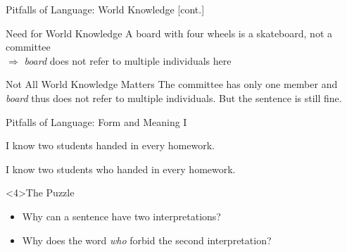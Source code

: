 \documentclass[xcolor={usenames,svgnames,x11names,dvipsnames,table}]{beamer}
\begin{document}
\begin{frame}{Pitfalls of Language: World Knowledge [cont.]}
    \begin{exe}
        \small
        \ex
        \begin{xlist}
        \end{xlist}
    \end{exe}

    \begin{block}{Need for World Knowledge}
        A board with four wheels is a skateboard, not a committee\\
        $\Rightarrow$ \emph{board} does not refer to multiple individuals here
    \end{block}

    \pause
    \begin{exe}
        \small
    \end{exe}
    \begin{block}{Not All World Knowledge Matters}
        The committee has only one member and \emph{board} thus does not refer to multiple individuals.
        But the sentence is still fine.
    \end{block}
\end{frame}

\begin{frame}{Pitfalls of Language: Form and Meaning I}
    \begin{exe}
        \small
        \ex I know two students handed in every homework.
    \end{exe}

    \begin{exe}
        \small
        \ex I know two students who handed in every homework.
    \end{exe}

    \bigskip
    \begin{block}<4>{The Puzzle}
        \begin{itemize}
            \item Why can a sentence have two interpretations?
            \item Why does the word \emph{who} forbid the second interpretation?
        \end{itemize}
    \end{block}
\end{frame}
\end{document}
